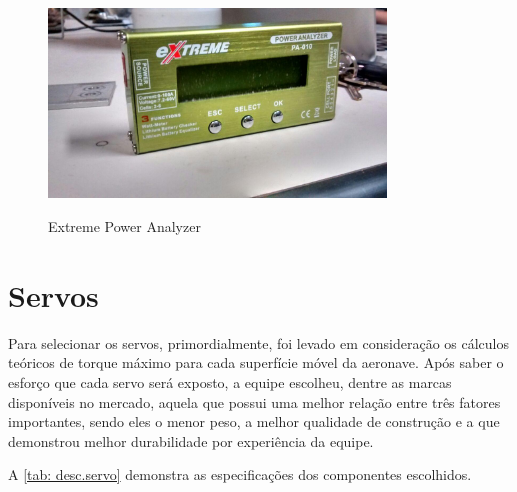 \begin{figure}[H]
    \centering
    \caption{Extreme Power Analyzer}
    \includegraphics[width=0.8\textwidth]{./Imagens/extreme}
    \label{fig:extreme}
\end{figure}

\section{Servos}

Para selecionar os servos, primordialmente, foi levado em consideração os cálculos
teóricos de torque máximo para cada superfície móvel da aeronave. Após saber o esforço que
cada servo será exposto, a equipe escolheu, dentre as marcas disponíveis no mercado, aquela
que possui uma melhor relação entre três fatores importantes, sendo eles o menor peso, a melhor
qualidade de construção e a que demonstrou melhor durabilidade por experiência da equipe.

A \autoref{tab: desc.servo} demonstra as especificações dos componentes escolhidos.

